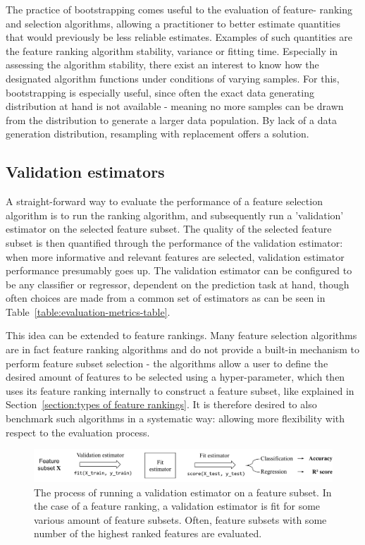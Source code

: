 \documentclass{article}
\begin{document}
The practice of bootstrapping comes useful to the evaluation of feature- ranking and selection algorithms, allowing a practitioner to better estimate quantities that would previously be less reliable estimates. Examples of such quantities are the feature ranking algorithm stability, variance or fitting time. Especially in assessing the algorithm stability, there exist an interest to know how the designated algorithm functions under conditions of varying samples. For this, bootstrapping is especially useful, since often the exact data generating distribution at hand is not available - meaning no more samples can be drawn from the distribution to generate a larger data population. By lack of a data generation distribution, resampling with replacement offers a solution.

\subsection{Validation estimators}\label{section:validation estimators}
A straight-forward way to evaluate the performance of a feature selection algorithm is to run the ranking algorithm, and subsequently run a 'validation' estimator on the selected feature subset. The quality of the selected feature subset is then quantified through the performance of the validation estimator: when more informative and relevant features are selected, validation estimator performance presumably goes up. The validation estimator can be configured to be any classifier or regressor, dependent on the prediction task at hand, though often choices are made from a common set of estimators as can be seen in Table~\ref{table:evaluation-metrics-table}. 

This idea can be extended to feature rankings. Many feature selection algorithms are in fact feature ranking algorithms and do not provide a built-in mechanism to perform feature subset selection - the algorithms allow a user to define the desired amount of features to be selected using a hyper-parameter, which then uses its feature ranking internally to construct a feature subset, like explained in Section~\ref{section:types of feature rankings}. It is therefore desired to also benchmark such algorithms in a systematic way: allowing more flexibility with respect to the evaluation process.

\begin{figure}[ht]
    \centering
    \includegraphics[width=\linewidth]{report/images/schematic-validation-estimators.pdf}
    \caption{The process of running a validation estimator on a feature subset. In the case of a feature ranking, a validation estimator is fit for some various amount of feature subsets. Often, feature subsets with some number of the highest ranked features are evaluated.}
    \label{fig:schematic-validation-estimators}
\end{figure}
\end{document}
